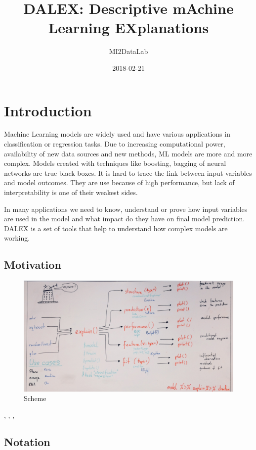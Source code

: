 \documentclass[]{book}
\title{DALEX: Descriptive mAchine Learning EXplanations}
\author{MI2DataLab}
\date{2018-02-21}
\theoremstyle{definition}
\theoremstyle{definition}
\theoremstyle{definition}
\theoremstyle{remark}
\begin{document}
\maketitle

{
\setcounter{tocdepth}{1}
\tableofcontents
}
\chapter{Introduction}\label{introduction}

Machine Learning models are widely used and have various applications in
classification or regression tasks. Due to increasing computational
power, availability of new data sources and new methods, ML models are
more and more complex. Models created with techniques like boosting,
bagging of neural networks are true black boxes. It is hard to trace the
link between input variables and model outcomes. They are use because of
high performance, but lack of interpretability is one of their weakest
sides.

In many applications we need to know, understand or prove how input
variables are used in the model and what impact do they have on final
model prediction. DALEX is a set of tools that help to understand how
complex models are working.

\section{Motivation}\label{motivation}

\begin{figure}
\centering
\includegraphics{images/DALEX_scheme.jpg}
\caption{Scheme}
\end{figure}

\citep{Strumbelj}, \citep{nnet_vis}, \citep{magix},
\citep{Zeiler_Fergus_2014}

\section{Notation}\label{notation}
\end{document}
